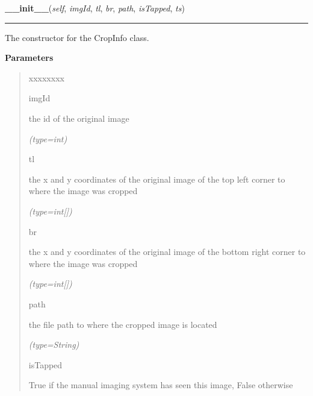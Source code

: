     \label{client_rest:CropInfo:__init__}

    \vspace{0.5ex}

\hspace{.8\funcindent}\begin{boxedminipage}{\funcwidth}

    \raggedright \textbf{\_\_init\_\_}(\textit{self}, \textit{imgId}, \textit{tl}, \textit{br}, \textit{path}, \textit{isTapped}, \textit{ts})

    \vspace{-1.5ex}

    \rule{\textwidth}{0.5\fboxrule}
\setlength{\parskip}{2ex}
    The constructor for the CropInfo class.

\setlength{\parskip}{1ex}
      \textbf{Parameters}
      \vspace{-1ex}

      \begin{quote}
        \begin{Ventry}{xxxxxxxx}

          \item[imgId]

          the id of the original image

            {\it (type=int)}

          \item[tl]

          the x and y coordinates of the original image of the top left 
          corner to where the image was cropped

            {\it (type=int[])}

          \item[br]

          the x and y coordinates of the original image of the bottom right
          corner to where the image was cropped

            {\it (type=int[])}

          \item[path]

          the file path to where the cropped image is located

            {\it (type=String)}

          \item[isTapped]

          True if the manual imaging system has seen this image, False 
          otherwise


\end{Ventry}
\end{quote}
\end{boxedminipage}
